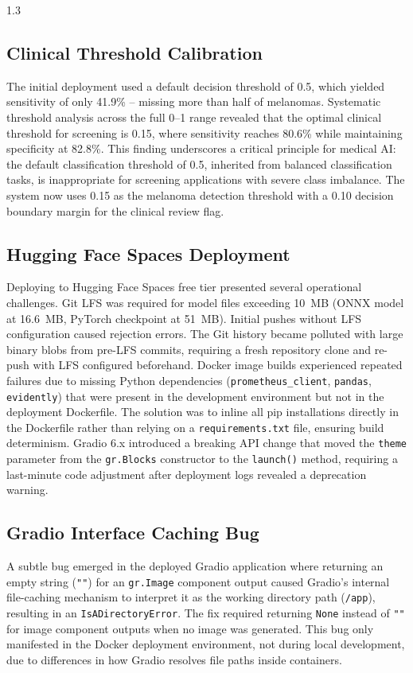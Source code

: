 \begin{spacing}{1.3}
\subsection{Clinical Threshold Calibration}

The initial deployment used a default decision threshold of 0.5, which yielded sensitivity of only 41.9\% -- missing more than half of melanomas. Systematic threshold analysis across the full 0--1 range revealed that the optimal clinical threshold for screening is 0.15, where sensitivity reaches 80.6\% while maintaining specificity at 82.8\%. This finding underscores a critical principle for medical AI: the default classification threshold of 0.5, inherited from balanced classification tasks, is inappropriate for screening applications with severe class imbalance. The system now uses 0.15 as the melanoma detection threshold with a 0.10 decision boundary margin for the clinical review flag.

\subsection{Hugging Face Spaces Deployment}

Deploying to Hugging Face Spaces free tier presented several operational challenges. Git LFS was required for model files exceeding 10~MB (ONNX model at 16.6~MB, PyTorch checkpoint at 51~MB). Initial pushes without LFS configuration caused rejection errors. The Git history became polluted with large binary blobs from pre-LFS commits, requiring a fresh repository clone and re-push with LFS configured beforehand. Docker image builds experienced repeated failures due to missing Python dependencies (\texttt{prometheus\_client}, \texttt{pandas}, \texttt{evidently}) that were present in the development environment but not in the deployment Dockerfile. The solution was to inline all pip installations directly in the Dockerfile rather than relying on a \texttt{requirements.txt} file, ensuring build determinism. Gradio 6.x introduced a breaking API change that moved the \texttt{theme} parameter from the \texttt{gr.Blocks} constructor to the \texttt{launch()} method, requiring a last-minute code adjustment after deployment logs revealed a deprecation warning.

\subsection{Gradio Interface Caching Bug}

A subtle bug emerged in the deployed Gradio application where returning an empty string (\texttt{""}) for an \texttt{gr.Image} component output caused Gradio's internal file-caching mechanism to interpret it as the working directory path (\texttt{/app}), resulting in an \texttt{IsADirectoryError}. The fix required returning \texttt{None} instead of \texttt{""} for image component outputs when no image was generated. This bug only manifested in the Docker deployment environment, not during local development, due to differences in how Gradio resolves file paths inside containers.


\end{spacing}
